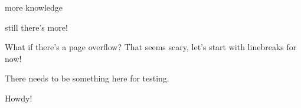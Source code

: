 more knowledge



still there's more!









\newpage



What if there's a page overflow? That seems scary, let's start with linebreaks for now!


















There needs to be something here for testing.









Howdy!